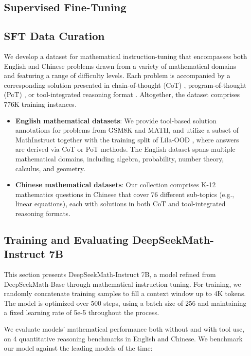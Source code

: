 \begin{itemize}[topsep=0pt]
\section{Supervised Fine-Tuning}

\subsection{SFT Data Curation}

We develop a dataset for mathematical instruction-tuning that encompasses both English and Chinese problems drawn from a variety of mathematical domains and featuring a range of difficulty levels. Each problem is accompanied by a corresponding solution presented in chain-of-thought (CoT) \citep{cot}, program-of-thought (PoT) \citep{pot,pal}, or tool-integrated reasoning format \citep{tora}. Altogether, the dataset comprises 776K training instances.

\begin{itemize}[topsep=0pt]
    \item \textbf{English mathematical datasets}: We provide tool-based solution annotations for problems from GSM8K and MATH, and utilize a subset of MathInstruct \citep{MathInstruct} together with the training split of Lila-OOD \citep{lila}, where answers are derived via CoT or PoT methods. The English dataset spans multiple mathematical domains, including algebra, probability, number theory, calculus, and geometry.
    \item \textbf{Chinese mathematical datasets}: Our collection comprises K-12 mathematics questions in Chinese that cover 76 different sub-topics (e.g., linear equations), each with solutions in both CoT and tool-integrated reasoning formats.
\end{itemize}

\subsection{Training and Evaluating DeepSeekMath-Instruct 7B}

This section presents DeepSeekMath-Instruct 7B, a model refined from DeepSeekMath-Base through mathematical instruction tuning. For training, we randomly concatenate training samples to fill a context window up to 4K tokens. The model is optimized over 500 steps, using a batch size of 256 and maintaining a fixed learning rate of 5e-5 throughout the process.

We evaluate models' mathematical performance both without and with tool use, on 4 quantitative reasoning benchmarks in English and Chinese. We benchmark our model against the leading models of the time:


\end{itemize}

